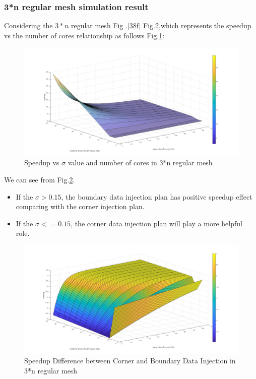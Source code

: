 \vspace*{30pt}

\subsubsection{3*n regular mesh simulation result}

Considering the $3*n $ regular mesh Fig .\ref{38f} Fig.\ref{bc3n},which represents the speedup vs the number of cores relationship as follows  Fig.\ref{corner3n}:

\begin{figure}[h]
\centering\includegraphics[width=0.85\linewidth]{figure/corner3n}
\caption{Speedup vs $\sigma$ value and number of cores in 3*n regular mesh}
\label{corner3n}
\end{figure}

\vspace*{50pt}

We can see from Fig.\ref{bc3n}. 

\begin{itemize}
\item If the $\sigma > 0.15$, the boundary data injection plan has positive speedup effect comparing with the corner injection plan. 
\item If the $\sigma <= 0.15$, the corner data injection plan will play a more helpful role.
\end{itemize}

\begin{figure}[h]
\centering\includegraphics[width=0.85\linewidth]{figure/bc3n}
\caption{Speedup Difference between Corner and Boundary Data Injection in 3*n regular mesh}
\label{bc3n}
\end{figure}

